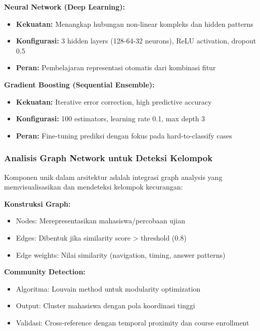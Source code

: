 \textbf{Neural Network (Deep Learning):}
\begin{itemize}
    \item \textbf{Kekuatan:} Menangkap hubungan non-linear kompleks dan hidden patterns
    \item \textbf{Konfigurasi:} 3 hidden layers (128-64-32 neurons), ReLU activation, dropout 0.5
    \item \textbf{Peran:} Pembelajaran representasi otomatis dari kombinasi fitur
\end{itemize}

\textbf{Gradient Boosting (Sequential Ensemble):}
\begin{itemize}
    \item \textbf{Kekuatan:} Iterative error correction, high predictive accuracy
    \item \textbf{Konfigurasi:} 100 estimators, learning rate 0.1, max depth 3
    \item \textbf{Peran:} Fine-tuning prediksi dengan fokus pada hard-to-classify cases
\end{itemize}

\subsubsection{Analisis Graph Network untuk Deteksi Kelompok}
\label{sec:graphNetworkAnalysis}

Komponen unik dalam arsitektur adalah integrasi graph analysis yang memvisualisasikan dan mendeteksi kelompok kecurangan:

\textbf{Konstruksi Graph:}
\begin{itemize}
    \item Nodes: Merepresentasikan mahasiswa/percobaan ujian
    \item Edges: Dibentuk jika similarity score > threshold (0.8)
    \item Edge weights: Nilai similarity (navigation, timing, answer patterns)
\end{itemize}

\textbf{Community Detection:}
\begin{itemize}
    \item Algoritma: Louvain method untuk modularity optimization
    \item Output: Cluster mahasiswa dengan pola koordinasi tinggi
    \item Validasi: Cross-reference dengan temporal proximity dan course enrollment
\end{itemize}

